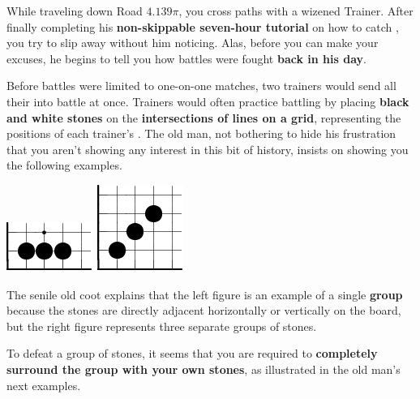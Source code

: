 

While traveling down Road \(4.139\pi\),
you cross paths with a wizened \mappMobimon{} Trainer. After finally
completing his
\textbf{non-skippable seven-hour tutorial} on how to catch \mappMobimon{},
you try to slip away without him noticing. Alas, before you can make your
excuses, he begins to tell you how \mappMobimon{} battles were fought
\textbf{back in his day}.

Before \mappMobimon{} battles were limited to one-on-one matches,
two trainers would send all their \mappMobimon{} into battle at once. Trainers
would often practice battling by placing \textbf{black and white stones}
on the \textbf{intersections of lines on a grid}, representing the positions
of each trainer's \mappMobimon{}. The old man,
not bothering to hide his frustration that you aren't showing any
interest in this bit of history, insists on showing you the following examples.

\begin{center}
  \includegraphics{gogetem/assets/explanation1-crop}
  \includegraphics{gogetem/assets/explanation2-crop}
\end{center}

The senile old coot explains that the left figure is an example of a single
\textbf{group} because the stones are directly adjacent horizontally
or vertically on the board, but the right figure represents
three separate groups of stones.

To defeat a group of stones, it seems that you are required to
\textbf{completely surround the group with your own stones}, as illustrated
in the old man's next examples.

